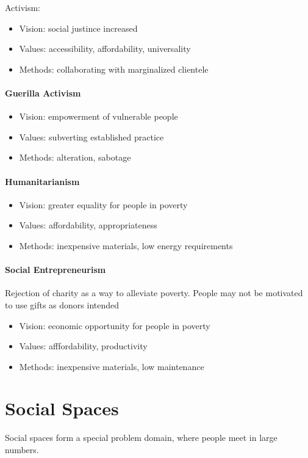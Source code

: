 \documentclass{article}
\begin{document}
Activism:
\begin{itemize}
	\item Vision: social justince increased
	\item Values: accessibility, affordability, universality
	\item Methods: collaborating with marginalized clientele
\end{itemize}

\paragraph{Guerilla Activism}
\label{par:guerilla_activism}
\begin{itemize}
	\item Vision: empowerment of vulnerable people
	\item Values: subverting established practice
	\item Methods: alteration, sabotage
\end{itemize}

\paragraph{Humanitarianism}
\label{par:humanitarianism}
\begin{itemize}
	\item Vision: greater equality for people in poverty
	\item Values: affordability, appropriateness
	\item Methods: inexpensive materials, low energy requirements
\end{itemize}

\paragraph{Social Entrepreneurism}
\label{par:social_entrepreneurism}
Rejection of charity as a way to alleviate poverty. People may not be motivated to use gifts as donors intended
\begin{itemize}
	\item Vision: economic opportunity for people in poverty
	\item Values: afffordability, productivity
	\item Methods: inexpensive materials, low maintenance
\end{itemize}

\section*{Social Spaces}
\label{sec:social_spaces}
Social spaces form a special problem domain, where people meet in large numbers.
\end{document}
